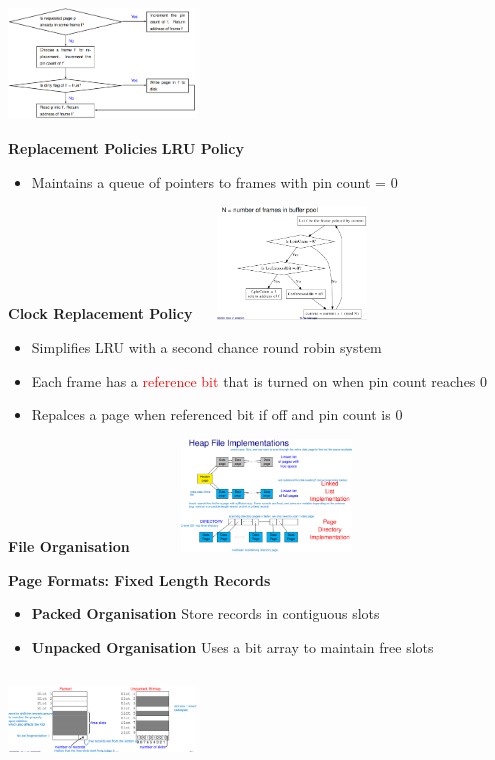 \documentclass[10pt, landscape]{article}
\begin{document}
\begin{multicols}{4}
\includegraphics[width=5cm, height =3cm]{buff_manager_handle_request.png}

\textbf{Replacement Policies}
\textbf{LRU Policy}
\begin{itemize}
  \item Maintains a queue of pointers to frames with pin count = 0
\end{itemize}


\textbf{Clock Replacement Policy}
\includegraphics*[width=5cm, height=3cm]{clock.png}
\begin{itemize}
  \item Simplifies LRU with a second chance round robin system
  \item Each frame has a \textcolor{red}{reference bit} that is turned on when pin count reaches 0
  \item Repalces a page when referenced bit if off and pin count is 0
\end{itemize}

\textbf{File Organisation}
\includegraphics*[width=7cm, height=3cm]{heap_file.png}

\textbf{Page Formats: Fixed Length Records}
\begin{itemize}
  \item \textbf{Packed Organisation} Store records in contiguous slots
  \item \textbf{Unpacked Organisation} Uses a bit array to maintain free slots
\end{itemize}

\includegraphics*[width=5cm, height=2.5cm]{page_org.png}



\end{multicols}
\end{document}
